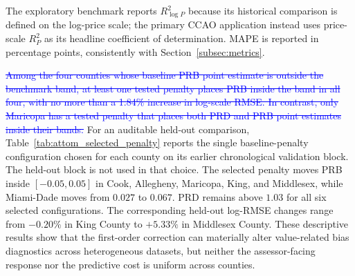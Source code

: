 \documentclass[10pt]{article}
\theoremstyle{definition}
\newcommand{\1}{\mathbf{1}}
\newcommand{\oldtext}[1]{\textcolor{blue}{\sout{#1}}}
\newcommand{\newtext}[1]{\textcolor{impGreen}{#1}}
\begin{document}
\newtext{The exploratory benchmark reports $R^2_{\log P}$ because its historical comparison is defined on the log-price scale; the primary CCAO application instead uses price-scale $R^2_P$ as its headline coefficient of determination. MAPE is reported in percentage points, consistently with Section~\ref{subsec:metrics}.}

\oldtext{Among the four counties whose baseline PRB point estimate is outside the benchmark band, at least one tested penalty places PRB inside the band in all four, with no more than a 1.84\% increase in log-scale RMSE. In contrast, only Maricopa has a tested penalty that places both PRD and PRB point estimates inside their bands.}
\newtext{For an auditable held-out comparison, Table~\ref{tab:attom_selected_penalty} reports the single baseline-penalty configuration chosen for each county on its earlier chronological validation block. The held-out block is not used in that choice. The selected penalty moves PRB inside $[-0.05,0.05]$ in Cook, Allegheny, Maricopa, King, and Middlesex, while Miami-Dade moves from $0.027$ to $0.067$. PRD remains above $1.03$ for all six selected configurations. The corresponding held-out log-RMSE changes range from $-0.20\%$ in King County to $+5.33\%$ in Middlesex County. These descriptive results show that the first-order correction can materially alter value-related bias diagnostics across heterogeneous datasets, but neither the assessor-facing response nor the predictive cost is uniform across counties.}
\end{document}
